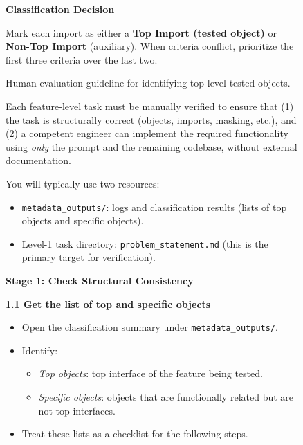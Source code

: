 \documentclass{article}
\begin{document}
\begin{figure}[t]
\begin{tcolorbox}
\textbf{Classification Decision}

Mark each import as either a \textbf{Top Import (tested object)} or \textbf{Non-Top Import} (auxiliary).  
When criteria conflict, prioritize the first three criteria over the last two.

\end{tcolorbox}
\caption{Human evaluation guideline for identifying top-level tested objects.}
\label{fig:top_guideline}
\end{figure}


\begin{figure}[t]
\centering
\begin{tcolorbox}[
    colback=white,
    colframe=black!60,
    colbacktitle=black!60,
    coltitle=white,
    title=Expert Verification Guideline for Feature-Level Tasks (part 1 of 2),
    fonttitle=\bfseries,
    boxrule=0.7pt,
    arc=1mm,
    width=0.98\linewidth
]


Each feature-level task must be manually verified to ensure that
(1) the task is structurally correct (objects, imports, masking, etc.), and
(2) a competent engineer can implement the required functionality using \emph{only}
the prompt and the remaining codebase, without external documentation.

You will typically use two resources:
\begin{itemize}
    \item \texttt{metadata\_outputs/}: logs and classification results (lists of top objects and specific objects).
    \item Level-1 task directory: \texttt{problem\_statement.md} (this is the primary target for verification).
\end{itemize}

\vspace{4pt}
\textbf{Stage 1: Check Structural Consistency}

\textbf{1.1 Get the list of top and specific objects}
\begin{itemize}
    \item Open the classification summary under \texttt{metadata\_outputs/}.
    \item Identify:
    \begin{itemize}
        \item \emph{Top objects}: top interface of the feature being tested.
        \item \emph{Specific objects}: objects that are functionally related but are not top interfaces.
    \end{itemize}
    \item Treat these lists as a checklist for the following steps.
\end{itemize}


\end{tcolorbox}
\end{figure}
\end{document}
